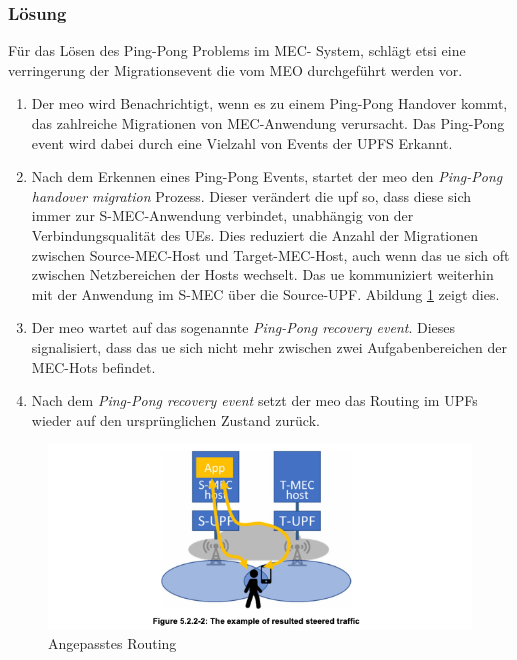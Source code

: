 \documentclass[runningheads]{llncs}
\numberwithin{figure}{section}
\begin{document}
\subsubsection{Lösung}
Für das Lösen des Ping-Pong Problems im MEC- System, schlägt \acrshort{etsi} eine verringerung der Migrationsevent die vom MEO durchgeführt werden vor.
\begin{enumerate}
  \item Der \acrshort{meo} wird Benachrichtigt, wenn es zu einem Ping-Pong Handover kommt, das zahlreiche Migrationen von MEC-Anwendung verursacht. Das
  Ping-Pong event wird dabei durch eine Vielzahl von Events der UPFS Erkannt.
  \item Nach dem Erkennen eines Ping-Pong Events, startet der \acrshort{meo} den \textit{Ping-Pong handover migration} Prozess. Dieser verändert die \acrshort{upf}
  so, dass diese sich immer zur S-MEC-Anwendung verbindet, unabhängig von der Verbindungsqualität des UEs. Dies reduziert die Anzahl der Migrationen
  zwischen Source-MEC-Host und Target-MEC-Host, auch wenn das \acrshort{ue} sich oft zwischen Netzbereichen der Hosts wechselt. Das \acrshort{ue} kommuniziert weiterhin
  mit der Anwendung im S-MEC über die Source-UPF. Abildung \ref{fig:pingpongrouting} zeigt dies.
  \item Der \acrshort{meo} wartet auf das sogenannte \textit{Ping-Pong recovery event}. Dieses signalisiert, dass das \acrshort{ue} sich nicht mehr zwischen zwei
  Aufgabenbereichen der MEC-Hots befindet.
  \item Nach dem \textit{Ping-Pong recovery event} setzt der \acrshort{meo} das Routing im UPFs wieder auf den ursprünglichen Zustand zurück.
\end{enumerate}
\begin{figure}
  \includegraphics[width=\linewidth]{images/pingpongrouting.png}
  \caption{Angepasstes Routing}
  \label{fig:pingpongrouting}
\end{figure}
\end{document}
